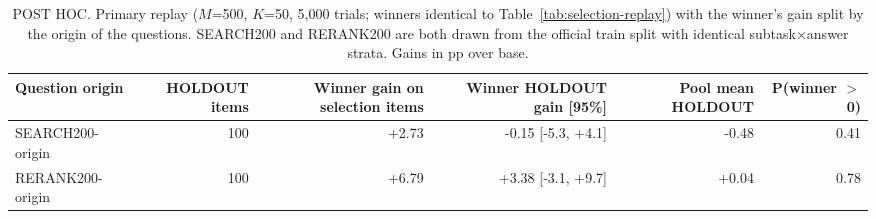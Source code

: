 \begin{table}[t]
\centering
\small
\begin{adjustbox}{max width=\linewidth}
\begin{tabular}{lrrrrr}
\toprule
Question origin & HOLDOUT items & Winner gain on selection items & Winner HOLDOUT gain [95\%] & Pool mean HOLDOUT & P(winner $>$ 0) \\
\midrule
SEARCH200-origin & 100 & +2.73 & -0.15 [-5.3, +4.1] & -0.48 & 0.41 \\
RERANK200-origin & 100 & +6.79 & +3.38 [-3.1, +9.7] & +0.04 & 0.78 \\
\bottomrule
\end{tabular}
\end{adjustbox}
\caption{POST HOC. Primary replay ($M$=500, $K$=50, 5,000 trials; winners identical to Table~\ref{tab:selection-replay}) with the winner's gain split by the origin of the questions. SEARCH200 and RERANK200 are both drawn from the official train split with identical subtask$\times$answer strata. Gains in pp over base.}
\label{tab:replay-origin}
\end{table}
